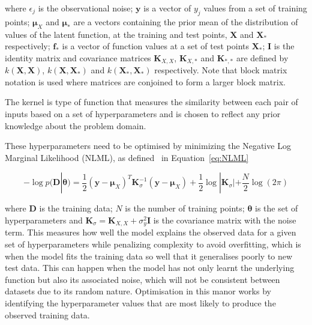 \documentclass[12pt]{article}
\begin{document}
    \noindent where $\epsilon_j$ is the observational noise; $\mathbf{y}$ is a vector of $y_j$ values from a set of training points; $\boldsymbol{\mu}_X$ and $\boldsymbol{\mu}_*$ are a vectors containing the prior mean of the distribution of values of the latent function, at the training and test points, $\mathbf{X}$ and  $\mathbf{X}_*$ respectively; $\mathbf{f}_*$ is a vector of function values at a set of test points $\mathbf{X}_*$; $\mathbf{I}$ is the identity matrix and covariance matrices $\mathbf{K}_{X,X}$, $\mathbf{K}_{X,*}$ and $\mathbf{K}_{*,*}$ are defined by $k(\mathbf{X},\mathbf{X})$, $k(\mathbf{X},\mathbf{X}_*)$ and $k(\mathbf{X}_*,\mathbf{X}_*)$ respectively.
    Note that block matrix notation is used where matrices are conjoined to form a larger block matrix.

    The kernel is type of function that measures the similarity between each pair of inputs based on a set of hyperparameters and is chosen to reflect any prior knowledge about the problem domain.

    These hyperparameters need to be optimised by minimizing the Negative Log Marginal Likelihood (NLML), as defined~\cite{murphy2023probabilistic} in Equation~\ref{eq:NLML}

    \begin{equation}
        -\log p(\mathbf{D}|\boldsymbol{\theta}) = \frac{1}{2} (\mathbf{y} - \boldsymbol{\mu}_X)^T \mathbf{K}_{\sigma}^{-1} (\mathbf{y} - \boldsymbol{\mu}_X) + \frac{1}{2} \log |\mathbf{K}_{\sigma}| + \frac{N}{2} \log(2\pi)\label{eq:NLML}
    \end{equation}


    \noindent where $\mathbf{D}$ is the training data; $N$ is the number of training points; $\boldsymbol{\theta}$ is the set of hyperparameters and $\mathbf{K}_{\sigma} = \mathbf{K}_{X,X} + \sigma^2_y \mathbf{I}$ is the covariance matrix with the noise term.
    This measures how well the model explains the observed data for a given set of hyperparameters while penalizing complexity to avoid overfitting, which is when the model fits the training data so well that it generalises poorly to new test data.
    This can happen when the model has not only learnt the underlying function but also its associated noise, which will not be consistent between datasets due to its random nature.
    Optimisation in this manor works by identifying the hyperparameter values that are most likely to produce the observed training data.
\end{document}
